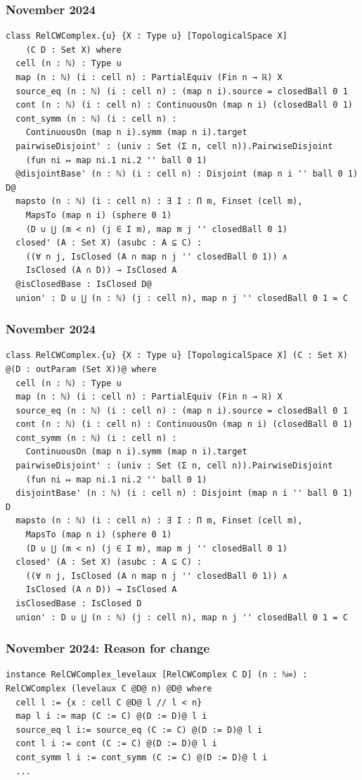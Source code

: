 \documentclass{beamer}
\begin{document}
\begin{frame}[fragile]
\frametitle{November 2024}
\begin{lstlisting}[basicstyle=\ttfamily\scriptsize]
class RelCWComplex.{u} {X : Type u} [TopologicalSpace X] 
    (C D : Set X) where
  cell (n : ℕ) : Type u
  map (n : ℕ) (i : cell n) : PartialEquiv (Fin n → ℝ) X
  source_eq (n : ℕ) (i : cell n) : (map n i).source = closedBall 0 1
  cont (n : ℕ) (i : cell n) : ContinuousOn (map n i) (closedBall 0 1)
  cont_symm (n : ℕ) (i : cell n) : 
    ContinuousOn (map n i).symm (map n i).target
  pairwiseDisjoint' : (univ : Set (Σ n, cell n)).PairwiseDisjoint 
    (fun ni ↦ map ni.1 ni.2 '' ball 0 1)
  @disjointBase' (n : ℕ) (i : cell n) : Disjoint (map n i '' ball 0 1) D@
  mapsto (n : ℕ) (i : cell n) : ∃ I : Π m, Finset (cell m),
    MapsTo (map n i) (sphere 0 1) 
    (D ∪ ⋃ (m < n) (j ∈ I m), map m j '' closedBall 0 1)
  closed' (A : Set X) (asubc : A ⊆ C) : 
    ((∀ n j, IsClosed (A ∩ map n j '' closedBall 0 1)) ∧ 
    IsClosed (A ∩ D)) → IsClosed A
  @isClosedBase : IsClosed D@
  union' : D ∪ ⋃ (n : ℕ) (j : cell n), map n j '' closedBall 0 1 = C
\end{lstlisting}
\end{frame}

\begin{frame}[fragile]
\frametitle{November 2024}
\begin{lstlisting}[basicstyle=\ttfamily\scriptsize]
class RelCWComplex.{u} {X : Type u} [TopologicalSpace X] (C : Set X) @(D : outParam (Set X))@ where
  cell (n : ℕ) : Type u
  map (n : ℕ) (i : cell n) : PartialEquiv (Fin n → ℝ) X
  source_eq (n : ℕ) (i : cell n) : (map n i).source = closedBall 0 1
  cont (n : ℕ) (i : cell n) : ContinuousOn (map n i) (closedBall 0 1)
  cont_symm (n : ℕ) (i : cell n) : 
    ContinuousOn (map n i).symm (map n i).target
  pairwiseDisjoint' : (univ : Set (Σ n, cell n)).PairwiseDisjoint 
    (fun ni ↦ map ni.1 ni.2 '' ball 0 1)
  disjointBase' (n : ℕ) (i : cell n) : Disjoint (map n i '' ball 0 1) D
  mapsto (n : ℕ) (i : cell n) : ∃ I : Π m, Finset (cell m),
    MapsTo (map n i) (sphere 0 1) 
    (D ∪ ⋃ (m < n) (j ∈ I m), map m j '' closedBall 0 1)
  closed' (A : Set X) (asubc : A ⊆ C) : 
    ((∀ n j, IsClosed (A ∩ map n j '' closedBall 0 1)) ∧ 
    IsClosed (A ∩ D)) → IsClosed A
  isClosedBase : IsClosed D
  union' : D ∪ ⋃ (n : ℕ) (j : cell n), map n j '' closedBall 0 1 = C
\end{lstlisting}
\end{frame}

\begin{frame}[fragile]
\frametitle{November 2024: Reason for change}
\begin{lstlisting}[basicstyle=\ttfamily\scriptsize]
instance RelCWComplex_levelaux [RelCWComplex C D] (n : ℕ∞) : RelCWComplex (levelaux C @D@ n) @D@ where
  cell l := {x : cell C @D@ l // l < n}
  map l i := map (C := C) @(D := D)@ l i
  source_eq l i:= source_eq (C := C) @(D := D)@ l i
  cont l i := cont (C := C) @(D := D)@ l i
  cont_symm l i := cont_symm (C := C) @(D := D)@ l i
  ...
\end{lstlisting}
\end{frame}
\end{document}
